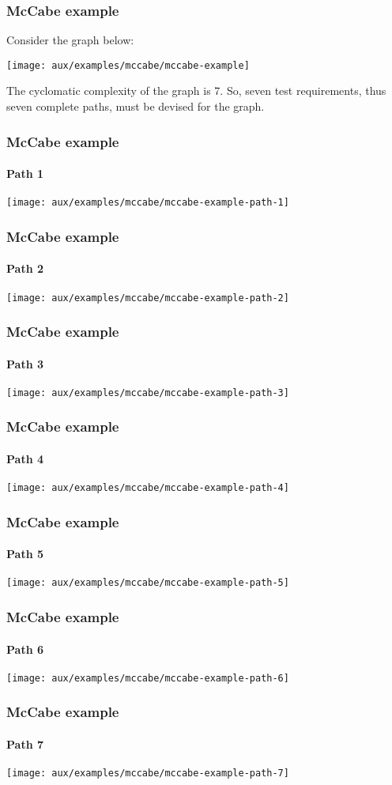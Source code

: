 \begin{frame}[hasprev=false, hasnext=true]
\frametitle{McCabe example}
\label{example:mccabe}

Consider the graph below:

\texttt{[image: aux/examples/mccabe/mccabe-example]}

The cyclomatic complexity of the graph is 7. So, seven test requirements,
thus seven complete paths, must be devised for the graph.
\end{frame}


\begin{frame}[c, hasprev=true, hasnext=true]
\frametitle{McCabe example}
\framesubtitle{Path 1}

\texttt{[image: aux/examples/mccabe/mccabe-example-path-1]}
\end{frame}


\begin{frame}[c]
\frametitle{McCabe example}
\framesubtitle{Path 2}

\texttt{[image: aux/examples/mccabe/mccabe-example-path-2]}
\end{frame}


\begin{frame}[c]
\frametitle{McCabe example}
\framesubtitle{Path 3}

\texttt{[image: aux/examples/mccabe/mccabe-example-path-3]}
\end{frame}


\begin{frame}[c]
\frametitle{McCabe example}
\framesubtitle{Path 4}

\texttt{[image: aux/examples/mccabe/mccabe-example-path-4]}
\end{frame}


\begin{frame}[c]
\frametitle{McCabe example}
\framesubtitle{Path 5}

\texttt{[image: aux/examples/mccabe/mccabe-example-path-5]}
\end{frame}


\begin{frame}[c]
\frametitle{McCabe example}
\framesubtitle{Path 6}

\texttt{[image: aux/examples/mccabe/mccabe-example-path-6]}
\end{frame}


\begin{frame}[c, hasprev=true, hasnext=false]
\frametitle{McCabe example}
\framesubtitle{Path 7}

\texttt{[image: aux/examples/mccabe/mccabe-example-path-7]}
\end{frame}
